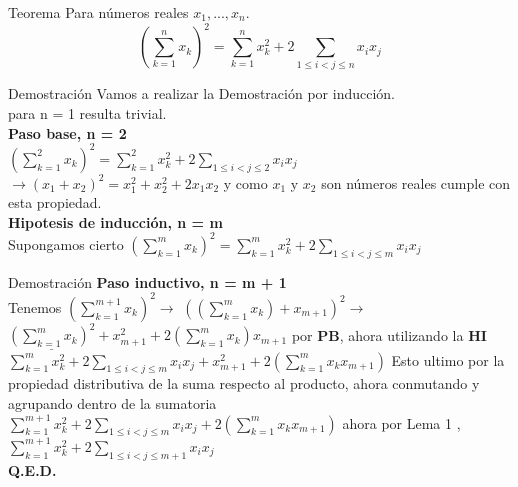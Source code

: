  
\begin{frame}{Teorema}
Para números reales $x_{1},...,x_{n}$.
\begin{equation*}
    (\sum_{k=1}^{n} x_{k})^{2} = \sum_{k=1}^{n} x_{k}^{2} + 2 \sum_{1 \leq i<j \leq n}x_{i}x_{j} 
\end{equation*}
    
\end{frame}
\begin{frame}{Demostración}
Vamos a realizar la Demostración por inducción. \\
para n = 1 resulta trivial. \\
\textbf{Paso base, n = 2 } \\
$(\sum_{k=1}^{2} x_{k})^{2} = \sum_{k=1}^{2} x_{k}^{2} + 2 \sum_{1 \leq i<j \leq 2}x_{i}x_{j}$ \\ $\to (x_{1}+x_{2})^{2} = x_{1}^{2}+x_{2}^{2}+2x_{1}x_{2}$ y como $x_{1}$ y $x_{2}$ son números reales cumple con esta propiedad. \\
\textbf{Hipotesis de inducción, n = m} \\ 
Supongamos cierto $(\sum_{k=1}^{m} x_{k})^{2} = \sum_{k=1}^{m} x_{k}^{2} + 2 \sum_{1 \leq i<j \leq m}x_{i}x_{j}$ 
\end{frame}
\begin{frame}{Demostración}
\textbf{Paso inductivo, n = m + 1} \\
Tenemos $(\sum_{k=1}^{m+1} x_{k})^{2} \to$ 
$((\sum_{k=1}^{m} x_{k})+x_{m+1})^{2} \to$
$ \underline{(\sum_{k=1}^{m} x_{k})^{2}}+x_{m+1}^{2}+2(\sum_{k=1}^{m} x_{k})x_{m+1}$ por \textbf{PB}, ahora utilizando la \textbf{HI}\\ 
$ \sum_{k=1}^{m} x_{k}^{2} + 2 \sum_{1 \leq i<j \leq m}x_{i}x_{j}+x_{m+1}^{2}+2(\sum_{k=1}^{m} x_{k}x_{m+1})$ Esto ultimo por la propiedad distributiva de la suma respecto al producto, ahora conmutando y agrupando dentro de la sumatoria $\sum_{k=1}^{m+1} x_{k}^{2} + 2 \sum_{1 \leq i<j \leq m}x_{i}x_{j} + 2(\sum_{k=1}^{m} x_{k}x_{m+1})$ ahora por Lema 1 , $\sum_{k=1}^{m+1} x_{k}^{2} + 2 \sum_{1 \leq i<j \leq m+1}x_{i}x_{j}$\\
\textbf{Q.E.D.}
\end{frame}
